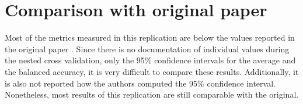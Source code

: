 \section{Comparison with original paper}
Most of the metrics measured in this replication are below the values reported 
in the original paper \cite{RN127}. Since there is no documentation of 
individual values during the nested cross validation, only the 95\% confidence 
intervals for the average and the balanced accuracy, it is very difficult to 
compare these results. Additionally, it is also not reported how the authors 
computed the 95\% confidence interval. Nonetheless, most results 
of this replication are still comparable with the original.

